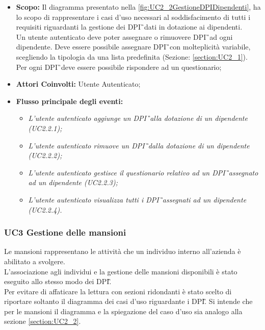 			\begin{itemize}
				\item \textbf{Scopo:} Il diagramma presentato nella \autoref{fig:UC2_2GestioneDPIDipendenti}, ha lo scopo di rappresentare i casi d'uso necessari al soddisfacimento di tutti i requisiti riguardanti la gestione dei \gls{DPI}\G\ dati in dotazione ai dipendenti. \\ Un utente autenticato deve poter assegnare o rimuovere \gls{DPI}\G\ ad ogni dipendente. Deve essere possibile assegnare \gls{DPI}\G\ con molteplicità variabile, scegliendo la tipologia da una lista predefinita (Sezione: \ref{section:UC2_1}).\\
				Per ogni \gls{DPI}\G\ deve essere possibile rispondere ad un questionario;
				\item \textbf{Attori Coinvolti:} Utente Autenticato;
				\item \textbf{Flusso principale degli eventi:} 
				\begin{itemize}
					\item \textit{L'utente autenticato aggiunge un \gls{DPI}\G\ alla dotazione di un dipendente (UC2.2.1);}
					\item \textit{L'utente autenticato rimuove un \gls{DPI}\G\ dalla dotazione di un dipendente  (UC2.2.2);}
					\item \textit{L'utente autenticato gestisce il questionario relativo ad un \gls{DPI}\G\ assegnato ad un dipendente (UC2.2.3);}
					\item \textit{L'utente autenticato visualizza tutti i \gls{DPI}\G\ assegnati ad un dipendente (UC2.2.4).}
				\end{itemize}
			\end{itemize}
	
	\newpage		
	\subsubsection{UC3 Gestione  delle mansioni}
		\label{section:UC3}
		Le mansioni rappresentano le attività che un individuo interno all'azienda è abilitato a svolgere.\\
		L'associazione agli individui e la gestione delle mansioni disponibili è stato eseguito allo stesso modo dei \gls{DPI}\G. \\
		Per evitare di affaticare la lettura con sezioni ridondanti è stato scelto di riportare soltanto il diagramma dei casi d'uso riguardante i \gls{DPI}\G. Si intende che per le mansioni il diagramma e la spiegazione del caso d'uso sia analogo alla sezione \ref{section:UC2_2}.\\
		\newpage 
